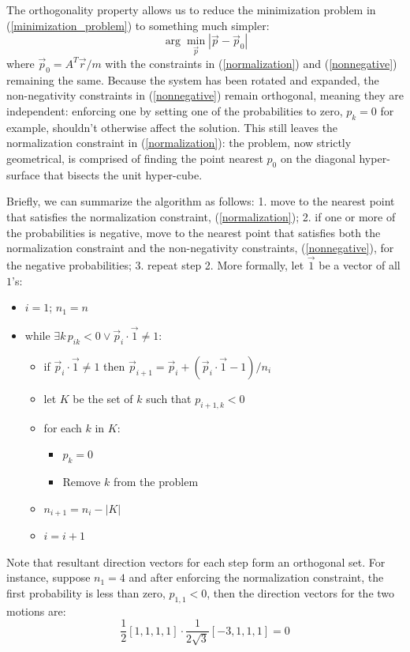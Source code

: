 \documentclass{article}
\begin{document}
The orthogonality property allows us to reduce the minimization problem 
in (\ref{minimization_problem}) to something much simpler:
\begin{equation}
	\arg \min_{\vec p} | \vec p - \vec p_0 |
\end{equation}
where $\vec p_0 = A^T \vec r/m$ with the constraints in (\ref{normalization}) and
(\ref{nonnegative}) remaining the same.
Because the system has been rotated and expanded, the non-negativity 
constraints in (\ref{nonnegative}) remain orthogonal, meaning they are 
independent: enforcing one by setting one of the probabilities to zero, 
$p_k=0$ for example, shouldn't otherwise affect the solution.
This still leaves the normalization constraint in (\ref{normalization}):
the problem, now strictly geometrical, is comprised of finding the point nearest $p_0$ on the diagonal hyper-surface that bisects the unit hyper-cube.

Briefly, we can summarize the algorithm as follows:
1. move to the nearest point that satisfies the normalization constraint,
(\ref{normalization}); 2. if one or more of the probabilities is negative,
move to the nearest point that satisfies both 
the normalization constraint
and the non-negativity constraints, (\ref{nonnegative}), for the negative probabilities;
3. repeat step 2.
More formally, let $\vec 1$ be a vector of all $1$'s:
\begin{itemize}
	\item $i=1$; $n_1=n$
	\item while $\exists k \, p_{ik} < 0 \lor \vec p_i \cdot \vec 1 \ne 1$:
	\begin{itemize}
		\item if $\vec p_i \cdot \vec 1 \ne 1$ then 
		$\vec p_{i+1} = \vec p_i + (\vec p_i \cdot \vec 1 - 1)/n_i$
		\item let $K$ be the set of $k$ such that $p_{i+1,k} < 0$
		\item for each $k$ in $K$:
		\begin{itemize}
			\item $p_k=0$
			\item Remove $k$ from the problem
		\end{itemize}
		\item $n_{i+1}=n_i-|K|$
		\item $i=i+1$
	\end{itemize}
\end{itemize}

Note that resultant direction vectors for each step form an orthogonal set.
For instance, suppose $n_1=4$ and after enforcing the normalization constraint,
the first probability is less than zero, $p_{1,1} < 0$,
then the direction vectors for the two motions are:
\begin{equation}
	\frac{1}{2}[1, 1, 1, 1] \cdot \frac{1}{2\sqrt{3}} [-3, 1, 1, 1] = 0
\end{equation}
\end{document}
